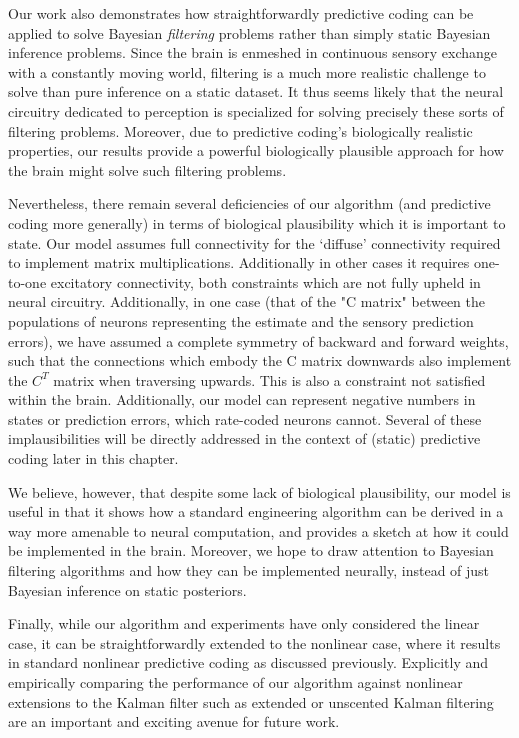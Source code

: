Our work also demonstrates how straightforwardly predictive coding can be applied to solve Bayesian \emph{filtering} problems rather than simply static Bayesian inference problems. Since the brain is enmeshed in continuous sensory exchange with a constantly moving world, filtering is a much more realistic challenge to solve than pure inference on a static dataset. It thus seems likely that the neural circuitry dedicated to perception is specialized for solving precisely these sorts of filtering problems. Moreover, due to predictive coding's biologically realistic properties, our results provide a powerful biologically plausible approach for how the brain might solve such filtering problems.

Nevertheless, there remain several deficiencies of our algorithm (and predictive coding more generally) in terms of biological plausibility which it is important to state. Our model assumes full connectivity for the `diffuse' connectivity required to implement matrix multiplications. Additionally in other cases it requires one-to-one excitatory connectivity, both constraints which are not fully upheld in neural circuitry. Additionally, in one case (that of the "C matrix" between the populations of neurons representing the estimate and the sensory prediction errors), we have assumed a complete symmetry of backward and forward weights, such that the connections which embody the C matrix downwards also implement the $C^T$ matrix when traversing upwards. This is also a constraint not satisfied within the brain. Additionally, our model can represent negative numbers in states or prediction errors, which rate-coded neurons cannot. Several of these implausibilities will be directly addressed in the context of (static) predictive coding later in this chapter.

We believe, however, that despite some lack of biological plausibility, our model is useful in that it shows how a standard engineering algorithm can be derived in a way more amenable to neural computation, and provides a sketch at how it could be implemented in the brain. Moreover, we hope to draw attention to Bayesian filtering algorithms and how they can be implemented neurally, instead of just Bayesian inference on static posteriors. 

Finally, while our algorithm and experiments have only considered the linear case, it can be straightforwardly extended to the nonlinear case, where it results in standard nonlinear predictive coding as discussed previously. Explicitly and empirically comparing the performance of our algorithm against nonlinear extensions to the Kalman filter such as extended or unscented \citep{wan2000unscented} Kalman filtering are an important and exciting avenue for future work.

